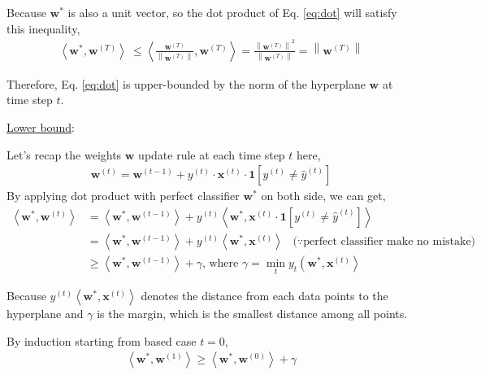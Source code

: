 \documentclass[11pt]{article}
\begin{document}
{{Because $\boldsymbol{w}^{*}$ is also a unit vector, so the dot product of Eq. \ref{eq:dot} will satisfy this inequality, 
\begin{align}
    \left\langle\boldsymbol{w}^{*}, \boldsymbol{w}^{(T)}\right\rangle \ \leq\left\langle\frac{\boldsymbol{w}^{(T)}}{\left\|\boldsymbol{w}^{(T)}\right\|}, \boldsymbol{w}^{(T)}\right\rangle=\frac{\left\|\boldsymbol{w}^{(T)}\right\|^{2}}{\left\|\boldsymbol{w}^{(T)}\right\|}=\left\|\boldsymbol{w}^{(T)}\right\|
    \label{eq:11}
\end{align}

Therefore, Eq. \ref{eq:dot} is upper-bounded by the norm of the hyperplane $\boldsymbol{w}$ at time step $t$.

\underline{Lower bound}:

Let's recap the weights $\boldsymbol{w}$ update rule at each time step $t$ here, 
\begin{align}
    \textbf{w}^{(t)} = \textbf{w}^{(t-1)} + y^{(t)} \cdot \textbf{x}^{(t)} \cdot\textbf{1}[y^{(t)}\neq \hat{y}^{(t)}]
\end{align}
By applying dot product with perfect classifier $\boldsymbol{w}^{*}$ on both side, we can get,
\begin{align}
    \left\langle\boldsymbol{w}^{*}, \boldsymbol{w}^{(t)}\right\rangle 
    &= \left\langle\boldsymbol{w}^{*}, \boldsymbol{w}^{(t-1)}\right\rangle + y^{(t)}\left\langle\boldsymbol{w}^{*}, \boldsymbol{x}^{(t)}\cdot\textbf{1}[y^{(t)}\neq \hat{y}^{(t)}]\right\rangle \nonumber\\ 
    &= \left\langle\boldsymbol{w}^{*}, \boldsymbol{w}^{(t-1)}\right\rangle+y^{(t)}\left\langle\boldsymbol{w}^{*}, \boldsymbol{x}^{(t)}\right\rangle \;\;\;(\because \text{perfect classifier make no mistake)} \nonumber\\
    &\geq \left\langle\boldsymbol{w}^{*}, \boldsymbol{w}^{(t-1)}\right\rangle + \gamma \text{, where } \gamma=\min _{t} y_{t}\left(\boldsymbol{w}^{*}, \boldsymbol{x}^{(t)}\right\rangle
\end{align}

Because $y^{(t)}\left\langle\boldsymbol{w}^{*}, \boldsymbol{x}^{(t)}\right\rangle$ denotes the distance from each data points to the hyperplane and $\gamma$ is the margin, which is the smallest distance among all points.

By induction starting from based case $t = 0$, 
\begin{align}
    \left\langle\boldsymbol{w}^{*}, \boldsymbol{w}^{(1)}\right\rangle \geq\left\langle\boldsymbol{w}^{*}, \boldsymbol{w}^{(0)}\right\rangle+\gamma
\end{align}

}}
\end{document}
